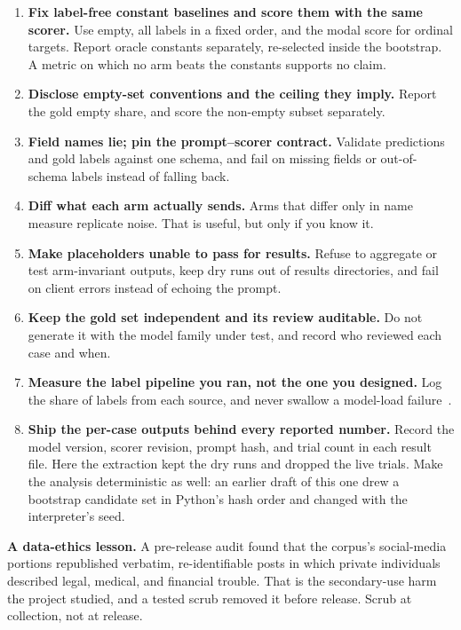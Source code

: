 \documentclass[10pt,twocolumn]{article}
\begin{document}
\begin{enumerate}[label=\textbf{L\arabic*}]
  \item \textbf{Fix label-free constant baselines and score them with the same
        scorer.} Use empty, all labels in a fixed order, and the modal score
        for ordinal targets. Report oracle constants separately, re-selected
        inside the bootstrap. A metric on which no arm beats the constants
        supports no claim.
  \item \textbf{Disclose empty-set conventions and the ceiling they imply.}
        Report the gold empty share, and score the non-empty subset separately.
  \item \textbf{Field names lie; pin the prompt--scorer contract.} Validate
        predictions and gold labels against one schema, and fail on missing
        fields or out-of-schema labels instead of falling back.
  \item \textbf{Diff what each arm actually sends.} Arms that differ only in
        name measure replicate noise. That is useful, but only if you know it.
  \item \textbf{Make placeholders unable to pass for results.} Refuse to
        aggregate or test arm-invariant outputs, keep dry runs out of results
        directories, and fail on client errors instead of echoing the prompt.
  \item \textbf{Keep the gold set independent and its review auditable.} Do not
        generate it with the model family under test, and record who reviewed
        each case and when.
  \item \textbf{Measure the label pipeline you ran, not the one you designed.}
        Log the share of labels from each source, and never swallow a model-load
        failure~\cite{ratner2017,pangakis2023}.
  \item \textbf{Ship the per-case outputs behind every reported number.} Record
        the model version, scorer revision, prompt hash, and trial count in each
        result file. Here the extraction kept the dry runs and dropped the live
        trials. Make the analysis deterministic as well: an earlier draft of
        this one drew a bootstrap candidate set in Python's hash order and
        changed with the interpreter's seed.
\end{enumerate}
\noindent\textbf{A data-ethics lesson.} A pre-release audit found that the
corpus's social-media portions republished verbatim, re-identifiable posts in
which private individuals described legal, medical, and financial trouble.
That is the secondary-use harm the project studied, and a tested scrub removed
it before release. Scrub at collection, not at release.
\end{document}

